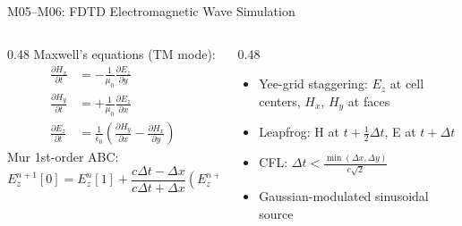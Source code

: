 \documentclass[aspectratio=169,10pt]{beamer}
\begin{document}
\begin{frame}{M05--M06: FDTD Electromagnetic Wave Simulation}
  \begin{columns}[T]
    \begin{column}{0.48\textwidth}
      Maxwell's equations (TM mode):
      \begin{align}
        \frac{\partial H_x}{\partial t} &= -\frac{1}{\mu_0}\frac{\partial E_z}{\partial y} \\[4pt]
        \frac{\partial H_y}{\partial t} &= +\frac{1}{\mu_0}\frac{\partial E_z}{\partial x} \\[4pt]
        \frac{\partial E_z}{\partial t} &= \frac{1}{\epsilon_0}\!\left(\frac{\partial H_y}{\partial x} - \frac{\partial H_x}{\partial y}\right)
      \end{align}
      \vspace{0.1cm}
      Mur 1st-order ABC:
      \[
        E_z^{n+1}[0] = E_z^n[1] + \frac{c\Delta t - \Delta x}{c\Delta t + \Delta x}\!\left(E_z^{n+1}[1] - E_z^n[0]\right)
      \]
    \end{column}
    \begin{column}{0.48\textwidth}
      \begin{itemize}[]
        \item Yee-grid staggering: $E_z$ at cell centers, $H_x$, $H_y$ at faces
        \item Leapfrog: H at $t+\frac{1}{2}\Delta t$, E at $t+\Delta t$
        \item CFL: $\Delta t < \frac{\min(\Delta x,\Delta y)}{c\sqrt{2}}$
        \item Gaussian-modulated sinusoidal source
      \end{itemize}
    \end{column}
  \end{columns}
\end{frame}
\end{document}
